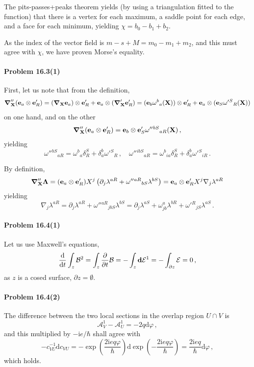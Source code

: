 \documentclass[a4paper,12pt]{article}
\def\d{\mathrm{d}}
\def\imagi{\mathrm{i}}
\newcommand{\problem}[1]{\paragraph{Problem #1}}
\begin{document}
The pits-passes+peaks theorem yields (by using a triangulation fitted to the function) that there is a vertex for each maximum, a saddle point for each edge, and a face for each minimum, yielding $\chi = b_0 - b_1 + b_2$.

As the index of the vector field is $m - s + M = m_0 - m_1 + m_2$, and this must agree with $\chi$, we have proven Morse's equality.


\problem{16.3(1)} First, let us note that from the definition,
\[
 \boldsymbol\nabla''_{\bf X}({\bf e}_a\otimes {\bf e}'_R) = (\boldsymbol\nabla_{\bf X}{\bf e}_a)\otimes {\bf e}'_R + {\bf e}_a\otimes (\boldsymbol\nabla'_{\bf X}{\bf e}'_R) = ({\bf e}_b \omega^b{}_a({\bf X}))\otimes {\bf e}'_{R} + {\bf e}_a \otimes ({\bf e}_S \omega'{}^S{}_R({\bf X}))
\]
on one hand, and on the other
\[
 \boldsymbol\nabla''_{\bf X} ({\bf e}_a\otimes{\bf e}'_R) = {\bf e}_b\otimes{\bf e}'_S \omega''{}^{bS}{}_{aR}({\bf X})\,,
\]
yielding
\[
 \omega''{}^{bS}{}_{aR} = \omega^b{}_a \delta^S_R + \delta^b_a \omega'{}^S{}_R\,,\quad \omega''{}^{ibS}{}_{aR} = \omega^b{}_{ia} \delta^S_R + \delta^b_a \omega'{}^S{}_{iR}\,.
\]

By definition,
\[
 \boldsymbol\nabla''_{\bf X}\boldsymbol\Lambda = ({\bf e}_a\otimes {\bf e}'_R) X^j\left(\partial_j \lambda^{aR} + \omega''{}^{aR}{}_{bS}\lambda^{bS}\right) = {\bf e}_a\otimes{\bf e}'_R X^j \nabla_j\lambda^{aR}
\]
yielding
\[
 \nabla_j\lambda^{aR} = \partial_j \lambda^{aR} + \omega''{}^{aR}{}_{jbS}\lambda^{bS} = \partial_j \lambda^{aS} + \omega^a_{jb}\lambda^{bR} + \omega'{}^R{}_{jS}\lambda^{aS}\,.
\]


\problem{16.4(1)} Let us use Maxwell's equations,
\[
 \frac{\d}{\d t}\int_z \mathcal{B}^2 = \int_z \frac{\partial}{\partial t}\mathcal{B} = -\int_z {\bf d}\mathcal{E}^1 = -\int_{\partial z}\mathcal{E} =0\,,
\]
as $z$ is a cosed surface, $\partial z=\emptyset$.


\problem{16.4(2)} The difference between the two local sections in the overlap region $U\cap V$ is
\[
 \mathcal{A}^1_V - \mathcal{A}^1_U = -2q\d\varphi\,,
\]
and this multiplied by $-\imagi e/\hbar$ shall agree with
\[
 -c_{VU}^{-1} \d c_{VU} = -\exp\left(\frac{2\imagi eq\varphi}{\hbar}\right)\d \exp\left(-\frac{2\imagi eq\varphi}{\hbar}\right)  = \frac{2\imagi e q}{\hbar}\d\varphi\,,
\]
which holds.
\end{document}
